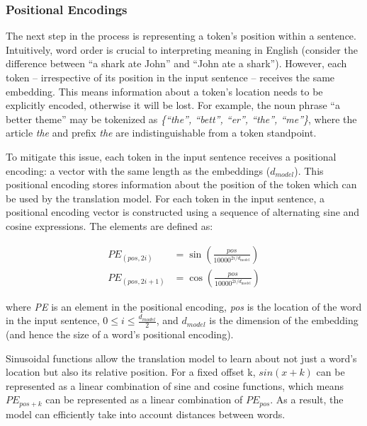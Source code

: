 \subsubsection{Positional Encodings}
The next step in the process is representing a token’s position within a sentence. Intuitively, word order is crucial to interpreting meaning in English (consider the difference between “a shark ate John” and “John ate a shark”). However, each token – irrespective of its position in the input sentence – receives the same embedding. This means information about a token’s location needs to be explicitly encoded, otherwise it will be lost. For example, the noun phrase “a better theme” may be tokenized as \textit{\{“the”, “bett”, “er”, “the”, “me”\}}, where the article \textit{the} and prefix \textit{the} are indistinguishable from a token standpoint. 

To mitigate this issue, each token in the input sentence receives a positional encoding: a vector with the same length as the embeddings ($d_{model}$). This positional encoding stores information about the position of the token which can be used by the translation model. For each token in the input sentence, a positional encoding vector is constructed using a sequence of alternating sine and cosine expressions. The elements are defined as: 

\[
\begin{aligned}
PE_{(pos,2i)} &= \sin\!\left( \frac{pos}{10000^{2i/d_{\text{model}}}} \right)\\
PE_{(pos,2i+1)} &= \cos\!\left( \frac{pos}{10000^{2i/d_{\text{model}}}} \right)
\end{aligned}
\]

\begin{center}
where \textit{PE} is an element in the positional encoding, \textit{pos} is the location of the word in the input sentence, $0 \leq \textit{i} \leq  \frac{d_{model}}{2}$, and \textit{$d_{model}$} is the dimension of the embedding (and hence the size of a word’s positional encoding).
\end{center}

Sinusoidal functions allow the translation model to learn about not just a word’s location but also its relative position. For a fixed offset k, $sin(x+k)$ can be represented as a linear combination of sine and cosine functions, which means $PE_{pos+k}$ can be represented as a linear combination of $PE_{pos}$. As a result, the model can efficiently take into account distances between words.

